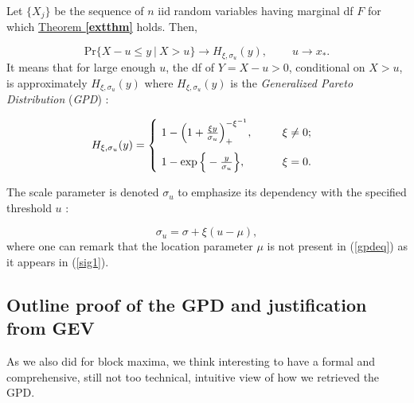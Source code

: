 \begin{theorem}\label{thm:gpd}
Let $\{X_j\}$ be the sequence of $n$ iid random variables having marginal df $F$ for which \hyperref[extthm]{Theorem \textbf{\ref{extthm}}} holds. Then,

\begin{equation} \label{gpdconv}
\text{Pr}\big\{X-u\leq y\ |\ X>u\big\}\longrightarrow H_{\xi,\sigma_u}(y), \ \ \ \ \ \ \ \ \ \ u\to x_*.
\end{equation}
It means that for large enough $u$, the df of  $Y=X-u>0$, conditional on $X>u$, is approximately $H_{\xi,\sigma_u}(y)$ where $H_{\xi,\sigma_u}(y)$ is the \emph{Generalized Pareto Distribution} (\emph{GPD}) :

\begin{equation}\label{gpdeq}
H_{\xi,\sigma_u}(y)=
\renewcommand{\arraystretch}{0.6}\left\{\begin{array}{@{}l@{\quad}l@{}}
\ 1-\Big(1+\frac{\xi y}{\sigma_u}\Big)_+^{-\xi^{-1}}, \ \ \ \ \ \  \ \ \xi\neq 0; \\ 
\vspace{0.0002cm} \\
\ 1-\exp\Big\{-\frac{y}{\sigma_u}\Big\}, \ \ \ \ \ \ \ \ \ \ \xi=0.

\end{array}\right.\kern-\nulldelimiterspace
\end{equation}

\end{theorem}
The scale parameter is denoted $\sigma_u$ to emphasize its dependency with the specified threshold $u$ :

\begin{equation}\label{sig1}
\sigma_{u}=\sigma+\xi (u-\mu),
\end{equation}
where one can remark that the location parameter $\mu$ is not present in (\ref{gpdeq}) as it appears in (\ref{sig1}). 

\subsection{Outline proof of the GPD and justification from GEV}
 As we also did for block maxima, we think interesting to have a formal and comprehensive, still not too technical, intuitive view of how we retrieved the GPD. %

